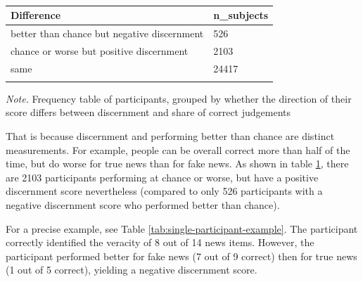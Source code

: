 \documentclass[
  doc,floatsintext]{apa6}
\begin{document}
\begin{table}[tbp]

\begin{center}
\begin{threeparttable}

\caption{\label{tab:compare-individual-measures}}

\begin{tabular}{ll}
\toprule
Difference & \multicolumn{1}{c}{n\_subjects}\\
\midrule
better than chance but negative discernment & 526\\
chance or worse but positive discernment & 2103\\
same & 24417\\
\bottomrule
\addlinespace
\end{tabular}

\begin{tablenotes}[para]
\normalsize{\textit{Note.} Frequency table of participants, grouped by whether the direction of their score differs between discernment and share of correct judgements}
\end{tablenotes}

\end{threeparttable}
\end{center}

\end{table}

That is because discernment and performing better than chance are distinct measurements. For example, people can be overall correct more than half of the time, but do worse for true news than for fake news. As shown in table \ref{tab:compare-individual-measures}, there are 2103 participants performing at chance or worse, but have a positive discernment score nevertheless (compared to only 526 participants with a negative discernment score who performed better than chance).

For a precise example, see Table \ref{tab:single-participant-example}. The participant correctly identified the veracity of 8 out of 14 news items. However, the participant performed better for fake news (7 out of 9 correct) then for true news (1 out of 5 correct), yielding a negative discernment score.
\end{document}
